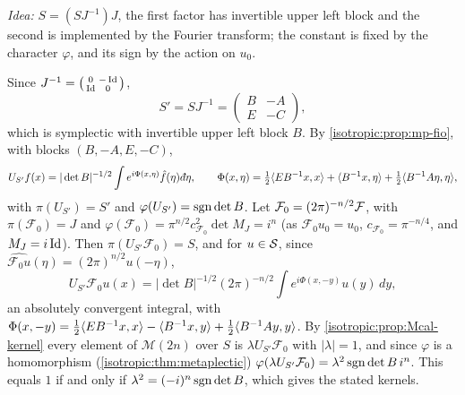 \emph{Idea:} $S=(SJ^{-1})J$, the first factor has invertible upper left block
and the second is implemented by the Fourier transform; the constant is fixed by
the character $\varphi$, and its sign by the action on $u_0$.

Since $J^{-1}=\bigl(\begin{smallmatrix}0&-\operatorname{Id}\\\operatorname{Id}&0\end{smallmatrix}\bigr)$,
\begin{equation*}
  S'=SJ^{-1}=\begin{pmatrix}B&-A\\E&-C\end{pmatrix},
\end{equation*}
which is symplectic with invertible upper left block $B$. By
\cref{isotropic:prop:mp-fio}, with blocks $(B,-A,E,-C)$,
\begin{equation*}
  U_{S'}f(x)=|\det B|^{-1/2}\int e^{i\Phi(x,\eta)}\hat f(\eta)\,\dbar\eta,\qquad
  \Phi(x,\eta)=\tfrac12\pair{EB^{-1}x}x+\pair{B^{-1}x}\eta+\tfrac12\pair{B^{-1}A\eta}\eta,
\end{equation*}
with $\pi(U_{S'})=S'$ and $\varphi(U_{S'})=\operatorname{sgn}\det B$. Let
$\mathcal F_0=(2\pi)^{-n/2}\mathcal{F}$, with $\pi(\mathcal F_0)=J$ and
$\varphi(\mathcal F_0)=\pi^{n/2}c_{\mathcal F_0}^2\det M_J=i^n$ (as $\mathcal F_0u_0=u_0$,
$c_{\mathcal F_0}=\pi^{-n/4}$, and $M_J=i\operatorname{Id}$). Then $\pi(U_{S'}\mathcal F_0)=S$, and
for $u\in\mathcal{S}$, since $\widehat{\mathcal F_0u}(\eta)=(2\pi)^{n/2}u(-\eta)$,
\begin{equation*}
  U_{S'}\mathcal F_0u(x)=|\det B|^{-1/2}(2\pi)^{-n/2}\int e^{i\Phi(x,-y)}u(y)\,dy,
\end{equation*}
an absolutely convergent integral, with
$\Phi(x,-y)=\frac12\langle EB^{-1}x, x\rangle-\langle B^{-1}x, y\rangle+\frac12\langle B^{-1}Ay, y\rangle$. By
\cref{isotropic:prop:Mcal-kernel} every element of $\mathcal M(2n)$ over $S$ is
$\lambda U_{S'}\mathcal F_0$ with $|\lambda|=1$, and since $\varphi$ is a
homomorphism (\cref{isotropic:thm:metaplectic})
$\varphi(\lambda U_{S'}\mathcal F_0)=\lambda^2\operatorname{sgn}\det B\,i^n$. This equals $1$ if and only if
$\lambda^2=(-i)^n\operatorname{sgn}\det B$, which gives the stated kernels.

